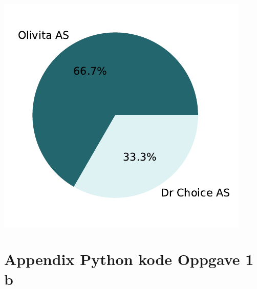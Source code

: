 \documentclass[
  12pt,
  a4paper,
  DIV=11,
  numbers=noendperiod]{scrartcl}
\begin{document}
\includegraphics{18_SOK2030_mappeoppgave_2_V24_files/figure-pdf/cell-27-output-1.pdf}

\clearpage

\section {Appendix Python kode Oppgave 1 b}
\end{document}
